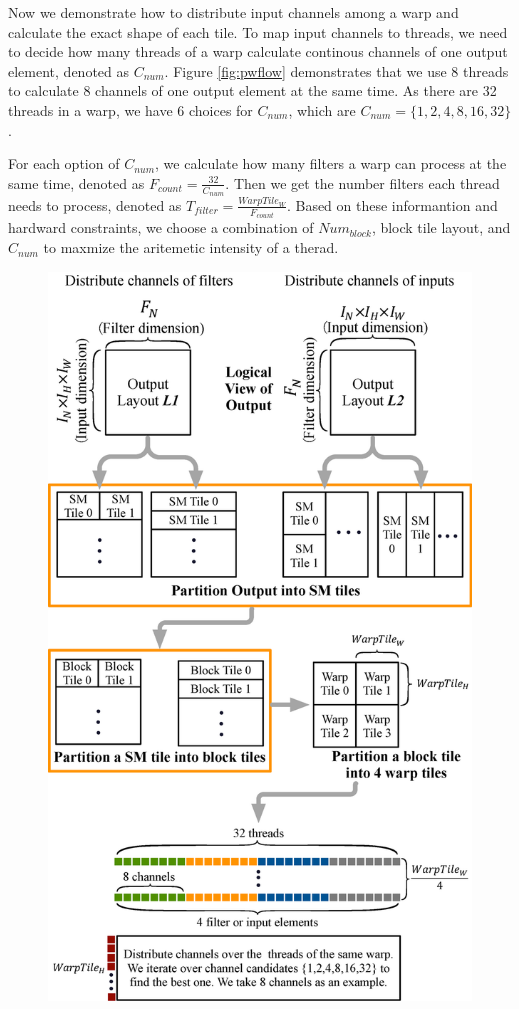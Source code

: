Now we demonstrate how to distribute input channels among a warp and calculate the exact shape of each tile.
To map input channels to threads, we need to decide how many threads of a warp calculate continous channels of one output element, denoted as $C_{num}$. 
Figure \ref{fig:pwflow} demonstrates that we use 8 threads to calculate 8 channels of one output element at the same time. 
As there are 32 threads in a warp, we have 6 choices for $C_{num}$, which are $C_{num}=\{1,2,4,8,16,32\}$.

For each option of $C_{num}$, we calculate how many filters a warp can process at the same time, denoted as $F_{count}=\frac{32}{C_{num}}$. Then we get the number filters each thread needs to process, denoted as $T_{filter}=\frac{WarpTile_W}{F_{count}}$.
Based on these informantion and hardward constraints, we choose a combination of $Num_{block}$, block tile layout, and $C_{num}$ to maxmize the aritemetic intensity of a therad.
\begin{figure}
	\centering
    \includegraphics[width=\columnwidth]{./figure/pwworkflow.eps}
    \caption{} \label{fig:pwworkflow}
\end{figure}
